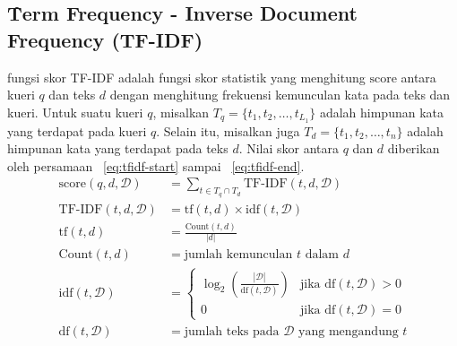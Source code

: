    \subsection{\f{Term Frequency - Inverse Document Frequency} (TF-IDF)}
    \label{sec:tfidf}
 
    fungsi skor TF-IDF adalah fungsi skor statistik yang menghitung $\text{score}$ antara kueri $q$ dan teks $d$ dengan menghitung frekuensi kemunculan kata pada teks dan kueri. Untuk suatu kueri $q$, misalkan $T_q= \{t_1, t_2, \dots, t_{L_1}\}$ adalah himpunan kata yang terdapat pada kueri $q$. Selain itu, misalkan juga $T_d = \{t_1, t_2, \dots, t_n\}$ adalah himpunan kata yang terdapat pada teks $d$. Nilai skor antara $q$ dan $d$ diberikan oleh persamaan \equ~\ref{eq:tfidf-start} sampai \equ~\ref{eq:tfidf-end}.
    \begin{align}
        \label{eq:tfidf-start}
        \text{score}(q,d,\mathcal{D}) &= \sum_{t \in T_q \cap T_d} \text{TF-IDF}(t, d, \mathcal{D}) \\
        \label{eq:tf-idf-weight}
        \text{TF-IDF}(t, d, \mathcal{D}) &= \text{tf}(t, d) \times \text{idf}(t, \mathcal{D}) \\
        \text{tf}(t, d) &= \frac{\text{Count}(t, d)}{|d|} \\
        \text{Count}(t, d) &= \text{jumlah kemunculan } t \text{ dalam } d \\
        \text{idf}(t, \mathcal{D}) &= \begin{cases}
            \log_2\left(\frac{|\mathcal{D}|}{\text{df}(t, \mathcal{D})}\right) & \text{jika } \text{df}(t, \mathcal{D}) > 0 \\
            0 & \text{jika } \text{df}(t, \mathcal{D}) = 0
        \end{cases} \\
        \text{df}(t, \mathcal{D}) &= \text{jumlah teks pada } \mathcal{D} \text{ yang mengandung } t
        \label{eq:tfidf-end}
    \end{align}

